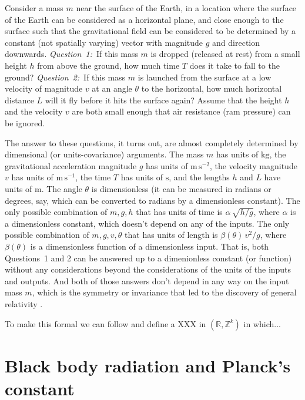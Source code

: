\documentclass{article}
\newcommand{\unit}[1]{\mathrm{#1}}
\newcommand{\kg}{\unit{kg}}
\newcommand{\m}{\unit{m}}
\newcommand{\s}{\unit{s}}
\begin{document}
Consider a mass $m$ near the surface of the Earth, in a location where the surface of the Earth can be considered as a horizontal plane, and close enough to the surface such that the gravitational field can be considered to be determined by a constant (not spatially varying) vector with magnitude $g$ and direction downwards.
\textsl{Question~1:}~If this mass $m$ is dropped (released at rest) from a small height $h$ from above the ground, how much time $T$ does it take to fall to the ground?
\textsl{Question~2:}~If this mass $m$ is launched from the surface at a low velocity of magnitude $v$ at an angle $\theta$ to the horizontal, how much horizontal distance $L$ will it fly before it hits the surface again?
Assume that the height $h$ and the velocity $v$ are both small enough that air resistance (ram pressure) can be ignored.

The answer to these questions, it turns out, are almost completely determined by dimensional (or units-covariance) arguments.
The mass $m$ has units of $\kg$, the gravitational acceleration magnitude $g$ has units of $\m\,\s^{-2}$, the velocity magnitude $v$ has units of $\m\,\s^{-1}$, the time $T$ has units of $\s$, and the lengths $h$ and $L$ have units of $\m$.
The angle $\theta$ is dimensionless (it can be measured in radians or degrees, say, which can be converted to radians by a dimensionless constant).
The only possible combination of $m, g, h$ that has units of time is $\alpha\,\sqrt{h/g}$, where $\alpha$ is a dimensionless constant, which doesn't depend on any of the inputs.
The only possible combination of $m, g, v, \theta$ that has units of length is $\beta(\theta)\,v^2/g$, where $\beta(\theta)$ is a dimensionless function of a dimensionless input.
That is, both Questions~1 and 2 can be answered up to a dimenionless constant (or function) without any considerations beyond the considerations of the units of the inputs and outputs.
And both of those answers don't depend in any way on the input mass $m$, which is the symmetry or invariance that led to the discovery of general relativity \cite{gr}.

To make this formal we can follow \cite{villar2022dimensionless} and define a XXX in $(\mathbb R, \mathbb Z^k)$ in which...

\section{Black body radiation and Planck's constant}
\end{document}
